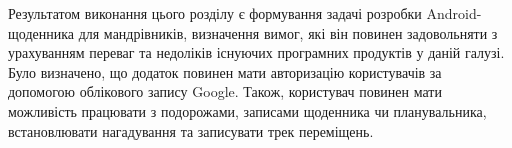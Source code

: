\documentclass[../main.tex]{subfiles}
\begin{document}
Результатом виконання цього розділу є формування задачі розробки Android-щоденника для мандрівників, визначення вимог, які він повинен задовольняти з урахуванням переваг та недоліків існуючих програмних продуктів у даній галузі. Було визначено, що додаток повинен мати авторизацію користувачів за допомогою облікового запису Google. Також, користувач повинен мати можливість працювати з подорожами, записами щоденника чи планувальника, встановлювати нагадування та записувати трек переміщень.

\end{document}
